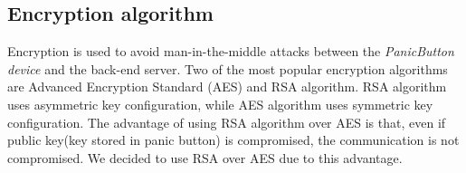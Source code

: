 \subsection{Encryption algorithm}
Encryption is used to avoid man-in-the-middle attacks between the  \emph{PanicButton device} and the back-end server. Two of the most popular encryption algorithms are Advanced Encryption Standard (AES) and RSA algorithm. RSA algorithm uses asymmetric key configuration, while AES algorithm uses symmetric key configuration. The advantage of using RSA algorithm over AES is that, even if public key(key stored in panic button) is compromised, the communication is not compromised.
We decided to use RSA over AES due to this advantage.

